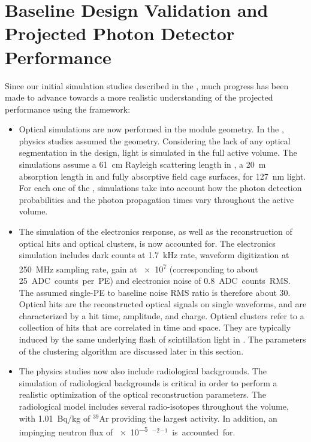 \section{Baseline Design Validation and Projected Photon Detector Performance}
\label{sec:dp-pds-performance}

Since our initial simulation studies described in the  \cite{Abi:2018rgm}, much progress has been made to advance towards a more realistic understanding of the projected  performance using the  framework:
%
\begin{itemize}
\item Optical simulations are now performed in the   module geometry. In the  , physics studies assumed the  geometry. Considering the lack of any optical segmentation in the  design, light is simulated in the full \dpactivelarmass {} active volume. The simulations assume a \SI{61}{\cm} Rayleigh scattering length in \lar, a \SI{20}{\m} absorption length in \lar and fully absorptive field cage surfaces, for \SI{127}{\nm} light. For each one of the \dpnumpmtch {}, simulations take into account how the photon detection probabilities and the photon propagation times vary throughout the  active volume.
%
\item The simulation of the electronics response, as well as the reconstruction of optical hits and optical clusters, is now accounted for. The electronics simulation includes  dark counts at \SI{1.7}{\kHz} rate, waveform digitization at \SI{250}{\MHz} sampling rate,  gain at \num{e7} (corresponding to about \SI{25}{ADC counts per PE}) and electronics noise of \SI{0.8}{ADC counts RMS}. The assumed single-PE to baseline noise RMS ratio is therefore about \num{30}. Optical hits are the reconstructed optical signals on single  waveforms, and are characterized by a hit time, amplitude, and charge. Optical clusters refer to a collection of  hits that are correlated in time and space. They are typically induced by the same underlying flash of scintillation light in \lar. The parameters of the clustering algorithm are discussed later in this section.


%
\item The physics studies now also include radiological backgrounds. The simulation of radiological backgrounds is critical in order to perform a realistic optimization of the optical reconstruction parameters. The radiological model includes several radio-isotopes throughout the \lar volume, with \SI{1.01}{\becquerel/\kg} of $^{39}$Ar providing the largest activity. In addition, an impinging neutron flux of \SI{e-5}{\cm$^{-2}$\s$^{-1}$} is accounted for.
\end{itemize} 

